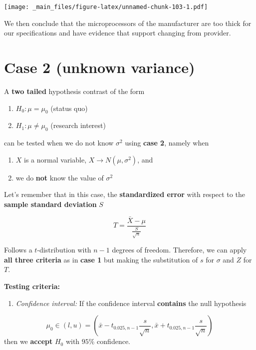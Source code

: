 \documentclass[
]{book}
\providecommand{\tightlist}{%
  \setlength{\itemsep}{0pt}\setlength{\parskip}{0pt}}
\begin{document}
\texttt{[image: \_main\_files/figure-latex/unnamed-chunk-103-1.pdf]}

We then conclude that the microprocessors of the manufacturer are too thick for our specifications and have evidence that support changing from provider.

\hypertarget{case-2-unknown-variance-1}{%
\section{Case 2 (unknown variance)}\label{case-2-unknown-variance-1}}

A \textbf{two tailed} hypothesis contrast of the form

\begin{enumerate}
\def\labelenumi{\alph{enumi}.}
\tightlist
\item
  \(H_0:\mu = \mu_0\) (status quo)
\item
  \(H_1:\mu \neq \mu_0\) (research interest)
\end{enumerate}

can be tested when we do not know \(\sigma^2\) using \textbf{case 2}, namely when

\begin{enumerate}
\def\labelenumi{\arabic{enumi}.}
\tightlist
\item
  \(X\) is a normal variable, \(X \rightarrow N(\mu, \sigma^2)\), and
\item
  we do \textbf{not} know the value of \(\sigma^2\)
\end{enumerate}

Let's remember that in this case, the \textbf{standardized error} with respect to the \textbf{sample standard deviation} \(S\)

\[T=\frac{\bar{X}-\mu}{\frac{S}{\sqrt{n}}}\]

Follows a \(t\)-distribution with \(n-1\) degrees of freedom. Therefore, we can apply \textbf{all three criteria} as in \textbf{case 1} but making the substitution of \(s\) for \(\sigma\) and \(Z\) for \(T\).

\textbf{Testing criteria:}

\begin{enumerate}
\def\labelenumi{\arabic{enumi}.}
\tightlist
\item
  \emph{Confidence interval:} If the confidence interval \textbf{contains} the null hypothesis
\end{enumerate}

\[\mu_0\in (l,u)=(\bar{x}-t_{0.025,n-1} \frac{s}{\sqrt{n}}, \bar{x}+t_{0.025,n-1} \frac{s}{\sqrt{n}})\] then we \textbf{accept} \(H_0\) with \(95\%\) confidence.
\end{document}
